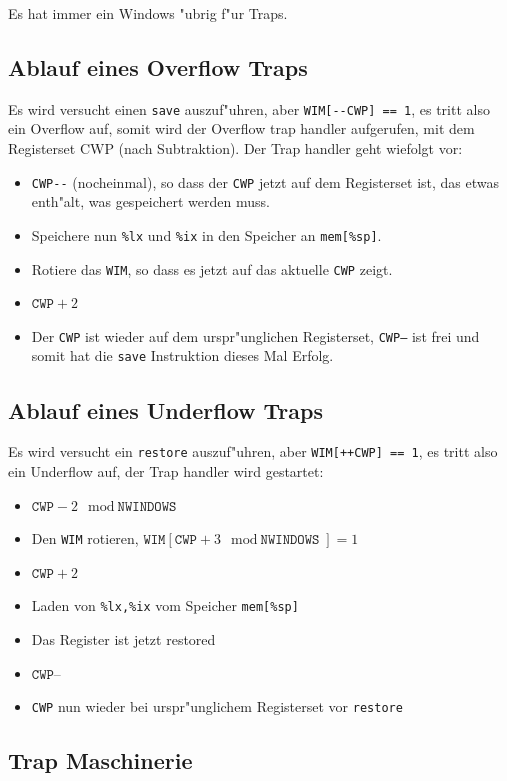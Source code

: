 \documentclass[german, 10pt, a4paper, twocolumn]{scrartcl}
\begin{document}
Es hat immer ein Windows "ubrig f"ur Traps.

\subsection{Ablauf eines Overflow Traps}

Es wird versucht einen \verb#save# auszuf"uhren, aber \verb#WIM[--CWP] == 1#, es tritt also ein Overflow auf, somit wird der Overflow trap handler aufgerufen, mit dem Registerset CWP (nach Subtraktion). Der Trap handler geht wiefolgt vor:
\begin{itemize}
	\item \verb#CWP--# (nocheinmal), so dass der \texttt{CWP} jetzt auf dem Registerset ist, das etwas enth"alt, was gespeichert werden muss.
	\item Speichere nun \verb#%lx# und \verb#%ix# in den Speicher an \verb#mem[%sp]#.
	\item Rotiere das \texttt{WIM}, so dass es jetzt auf das aktuelle \texttt{CWP} zeigt.
	\item $\texttt{CWP}+2$
	\item Der \texttt{CWP} ist wieder auf dem urspr"unglichen Registerset, \texttt{CWP--} ist frei und somit hat die \verb#save# Instruktion dieses Mal Erfolg.
\end{itemize}

\subsection{Ablauf eines Underflow Traps}

Es wird versucht ein \verb#restore# auszuf"uhren, aber \verb#WIM[++CWP] == 1#, es tritt also ein Underflow auf, der Trap handler wird gestartet:
\begin{itemize}
	\item $\texttt{CWP}-2 \mod \texttt{NWINDOWS}$
	\item Den \texttt{WIM} rotieren, $\texttt{WIM}[\texttt{CWP}+3 \mod \texttt{NWINDOWS}] = 1$
	\item $\texttt{CWP}+2$
	\item Laden von \verb#%lx,%ix# vom Speicher \verb#mem[%sp]#
	\item Das Register ist jetzt restored
	\item $\texttt{CWP--}$
	\item \texttt{CWP} nun wieder bei urspr"unglichem Registerset vor \verb#restore#
\end{itemize}

\subsection{Trap Maschinerie}
\end{document}
